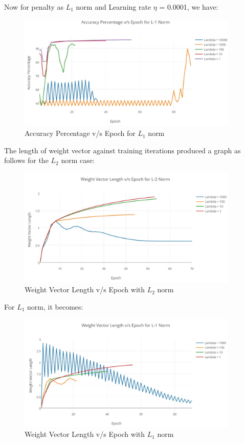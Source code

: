 \documentclass{article}
\begin{document}
Now for penalty as $L_{1}$ norm and Learning rate $\eta$ = 0.0001, we have:
\newpage
\begin{figure}[t]
  \includegraphics[width=105mm]{graphs/5_b_L1_new.JPG}
  \caption{Accuracy Percentage v/s Epoch for $L_{1}$ norm}
  \label{fig:graph 5(b) l1}
\end{figure}
The length of weight vector against training iterations produced a graph as follows for the $L_{2}$ norm case:
\begin{figure}[h!]
  \includegraphics[width=105mm]{graphs/5_c.JPG}
  \caption{Weight Vector Length v/s Epoch with $L_{2}$ norm}
  \label{fig:graph 5(c) l2}
\end{figure}

For $L_{1}$ norm, it becomes:
\begin{figure}[h!]
  \includegraphics[width=105mm]{graphs/5_c_negative_l1.JPG}
  \caption{Weight Vector Length v/s Epoch with $L_{1}$ norm}
  \label{fig:graph 5(c) l1}
\end{figure}
\end{document}
